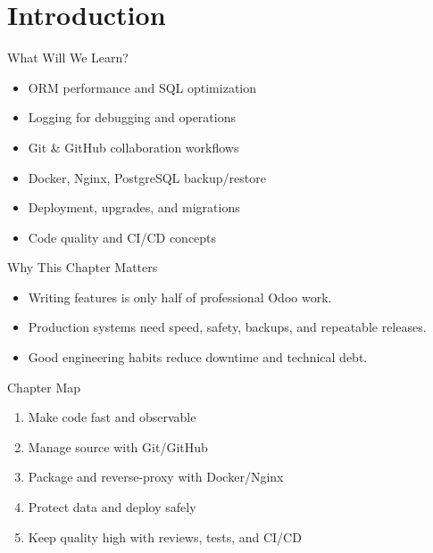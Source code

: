 \section{Introduction}

\begin{frame}{What Will We Learn?}
	\begin{itemize}
		\item ORM performance and SQL optimization
		\item Logging for debugging and operations
		\item Git \& GitHub collaboration workflows
		\item Docker, Nginx, PostgreSQL backup/restore
		\item Deployment, upgrades, and migrations
		\item Code quality and CI/CD concepts
	\end{itemize}
\end{frame}

\begin{frame}{Why This Chapter Matters}
	\begin{itemize}
		\item Writing features is only half of professional Odoo work.
		\item Production systems need speed, safety, backups, and repeatable releases.
		\item Good engineering habits reduce downtime and technical debt.
	\end{itemize}
\end{frame}

\begin{frame}{Chapter Map}
	\begin{enumerate}
		\item Make code fast and observable
		\item Manage source with Git/GitHub
		\item Package and reverse-proxy with Docker/Nginx
		\item Protect data and deploy safely
		\item Keep quality high with reviews, tests, and CI/CD
	\end{enumerate}
\end{frame}
